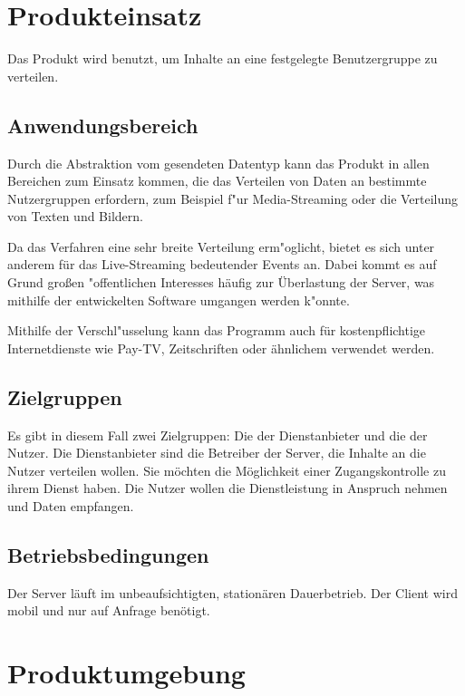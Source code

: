 \documentclass[a4paper,10pt]{scrartcl}
\begin{document}
\section{Produkteinsatz}

Das Produkt wird benutzt, um Inhalte an eine festgelegte Benutzergruppe zu verteilen. 

\subsection{Anwendungsbereich}

Durch die Abstraktion vom gesendeten Datentyp kann das Produkt in allen Bereichen zum Einsatz kommen,
die das Verteilen von Daten an bestimmte Nutzergruppen erfordern, zum Beispiel f"ur Media-Streaming oder
die Verteilung von Texten und Bildern.

Da das Verfahren eine sehr breite Verteilung erm"oglicht, bietet es sich unter anderem für das
Live-Streaming bedeutender Events an. Dabei kommt es auf Grund großen "offentlichen Interesses
häufig zur Überlastung der Server, was mithilfe der entwickelten Software umgangen werden k"onnte.

Mithilfe der Verschl"usselung kann das Programm auch für kostenpflichtige Internetdienste
wie Pay-TV, Zeitschriften oder ähnlichem verwendet werden.

\subsection{Zielgruppen}

Es gibt in diesem Fall zwei Zielgruppen: Die der Dienstanbieter und die der Nutzer. Die Dienstanbieter sind die Betreiber der Server, die Inhalte an die Nutzer verteilen wollen. Sie
möchten die Möglichkeit einer Zugangskontrolle zu ihrem Dienst haben. Die Nutzer wollen die Dienstleistung in Anspruch nehmen und Daten empfangen.

\subsection{Betriebsbedingungen}

Der Server läuft im unbeaufsichtigten, stationären Dauerbetrieb. Der Client wird mobil und nur auf Anfrage benötigt.

\section{Produktumgebung}
\end{document}
